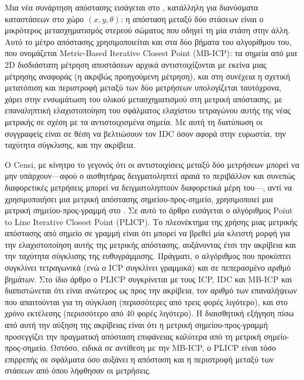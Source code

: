 Μια νέα συνάρτηση απόστασης εισάγεται στο \cite{Minguezb}, κατάλληλη για
διανύσματα καταστάσεων στο χώρο $(x,y,\theta)$: η απόσταση μεταξύ δύο στάσεων
είναι ο μικρότερος μετασχηματισμός στερεού σώματος που οδηγεί τη μία στάση στην
άλλη. Αυτό το μέτρο απόστασης χρησιμοποιείται και στα δύο βήματα του αλγορίθμου
του, που ονομάζεται Metric-Based Iterative Closest Point (MB-ICP): τα σημεία
από μια 2D δισδιάστατη μέτρηση αποστάσεων αρχικά αντιστοιχίζονται με εκείνα
μιας μέτρησης αναφοράς (η ακριβώς προηγούμενη μέτρηση), και στη συνέχεια η
σχετική μετατόπιση και περιστροφή μεταξύ των δύο μετρήσεων υπολογίζεται
ταυτόχρονα, χάρει στην ενσωμάτωση του ολικού μετασχηματισμού στη μετρική
απόστασης, με επαναληπτική ελαχιστοποίηση του σφάλματος ελαχίστου τετραγώνου
αυτής της νέας μετρικής σε σχέση με τα αντιστοιχισμένα σημεία. Με αυτή τη
διατύπωση οι συγγραφείς είναι σε θέση να βελτιώσουν τον IDC όσον αφορά στην
ευρωστία, την ταχύτητα σύγκλισης, και την ακρίβεια.

O Censi, με κίνητρο το γεγονός ότι οι αντιστοιχίσεις μεταξύ δύο μετρήσεων
μπορεί να μην υπάρχουν---αφού ο αισθητήρας δειγματοληπτεί αραιά το περιβάλλον
και συνεπώς διαφορετικές μετρήσεις μπορεί να δειγματοληπτούν διαφορετικά μέρη
του---, αντί να χρησιμοποιήσει μια μετρική απόστασης σημείου-προς-σημείο,
χρησιμοποιεί μια μετρική σημείου-προς-γραμμή στο \cite{Censi2008a}. Σε αυτό το
άρθρο εισάγεται ο αλγόριθμος Point to Line Iterative Closest Point (PLICP). Το
πλεονέκτημα της χρήσης μιας μετρικής απόστασης από σημείο σε γραμμή είναι ότι
μπορεί να βρεθεί μία κλειστή μορφή για την ελαχιστοποίηση αυτής της μετρικής
απόστασης, αυξάνοντας έτσι την ακρίβεια και την ταχύτητα σύγκλισης της
ευθυγράμμισης. Πράγματι, ο αλγόριθμος που προκύπτει συγκλίνει τετραγωνικά (ενώ
ο ICP συγκλίνει γραμμικά) και σε πεπερασμένο αριθμό βημάτων. Στο ίδιο άρθρο ο
PLICP συγκρίνεται με τους ICP, IDC και MB-ICP και διαπιστώνεται ότι είναι
ανώτερος ως προς την ακρίβεια, τον αριθμό των επαναλήψεων που απαιτούνται για
τη σύγκλιση (περισσότερες από τρεις φορές λιγότερο), και στο χρόνο εκτέλεσης
(περισσότερο από 40 φορές λιγότερο). Η διαισθητική εξήγηση πίσω από αυτή την
αύξηση της ακρίβειας είναι ότι η μετρική σημείου-προς-γραμμή προσεγγίζει την
πραγματική απόσταση επιφάνειας καλύτερα από τη μετρική σημείο-προς-σημείο.
Ωστόσο, ειδικά σε αντίθεση με την MB-ICP, ο PLICP είναι τόσο επιρρεπής σε
σφάλματα όσο αυξάνει η απόσταση και η περιστροφή μεταξύ των στάσεων από όπου
λήφθησαν οι μετρήσεις.

